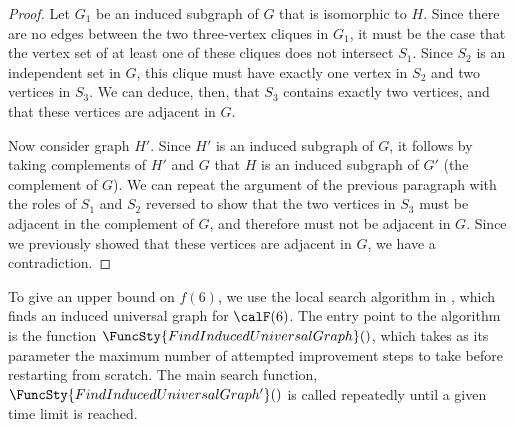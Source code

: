 \begin{proof}
    Let $G_1$ be an induced
    subgraph of $G$ that is isomorphic to $H$.  Since there are
    no edges between the two three-vertex cliques in $G_1$, it must be the case that the
    vertex set of at least one of these cliques does not intersect $S_1$.
    Since $S_2$ is an independent set in $G$, this clique must have exactly
    one vertex in $S_2$ and two vertices in $S_3$.  We can deduce, then, that
    $S_3$ contains exactly two vertices, and that these vertices are adjacent in $G$.

    Now consider graph $H'$.  Since $H'$ is an induced subgraph of $G$, it
    follows by taking complements of $H'$ and $G$ that $H$ is an induced
    subgraph of $G'$ (the complement of $G$).  We can repeat the argument
    of the previous paragraph with the roles of $S_1$ and $S_2$ reversed to
    show that the two vertices in $S_3$ must be adjacent in the complement of
    $G$, and therefore must not be adjacent in $G$.  Since we previously showed that
    these vertices are adjacent in $G$, we have a contradiction.
\end{proof}

To give an upper bound
on $f(6)$, we use the local search algorithm in ,
which finds an induced universal graph for $\calF(6)$.
The entry point to the algorithm is the function $\FuncSty{FindInducedUniversalGraph}()$,
which takes as its parameter the maximum number of attempted improvement steps to
take before restarting from scratch.  The main search function,
$\FuncSty{FindInducedUniversalGraph'}()$ is called repeatedly until
a given time limit is reached.

